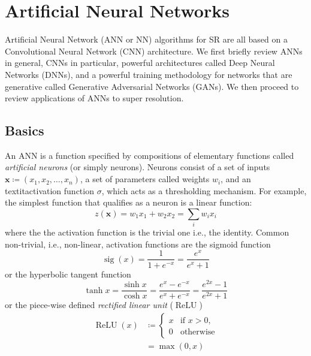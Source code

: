 %
\section{Artificial Neural Networks}\label{sec:neural-networks}
\localtableofcontents
Artificial Neural Network (ANN or NN) algorithms for SR are all based on a Convolutional Neural Network (CNN) architecture.
%
We first briefly review ANNs in general, CNNs in particular, powerful architectures called Deep Neural Networks (DNNs), and a powerful training methodology for networks that are generative called Generative Adversarial Networks (GANs).
%
We then proceed to review applications of ANNs to super resolution.
%
\subsection{Basics}

An ANN is a function specified by compositions of elementary functions called \textit{artificial neurons} (or simply neurons).
%
Neurons consist of a set of inputs \(\mathbf{x} \coloneqq (x_1, x_2, \dots, x_n)\), a set of parameters called weights \(w_i\), and an textit{activation function} \(\sigma\), which acts as a thresholding mechanism.
%
For example, the simplest function that qualifies as a neuron is a linear function:
\begin{equation}
    z(\mathbf{x}) = w_1 x_1 + w_2 x_2 = \sum_i w_i x_i
    \label{eqn:simpleann}
\end{equation}
where the the activation function is the trivial one i.e., the identity.
%
Common non-trivial, i.e., non-linear, activation functions are the sigmoid function
\begin{equation}
    \operatorname{sig}(x)={\frac {1}{1+e^{-x}}}={\frac {e^{x}}{e^{x}+1}}
\end{equation}
or the hyperbolic tangent function
\begin{equation}
    \tanh x={\frac {\sinh x}{\cosh x}}={\frac {e^{x}-e^{-x}}{e^{x}+e^{-x}}}={\frac {e^{2x}-1}{e^{2x}+1}}
\end{equation}
or the piece-wise defined \textit{rectified linear unit} (\(\operatorname{ReLU}\))
\begin{align}
    \operatorname{ReLU}(x) & \coloneqq \begin{cases}x&{\text{if }}x>0,\\0&{\text{otherwise}}\end{cases} \\
                           & = \max(0, x)
\end{align}
